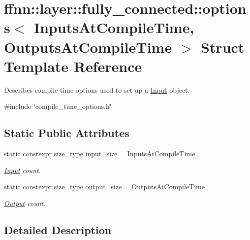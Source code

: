 \hypertarget{structffnn_1_1layer_1_1fully__connected_1_1options}{\section{ffnn\-:\-:layer\-:\-:fully\-\_\-connected\-:\-:options$<$ Inputs\-At\-Compile\-Time, Outputs\-At\-Compile\-Time $>$ Struct Template Reference}
\label{structffnn_1_1layer_1_1fully__connected_1_1options}
}


Describes compile-\/time options used to set up a \hyperlink{classffnn_1_1layer_1_1_input}{Input} object.  




{\ttfamily \#include \char`\"{}compile\-\_\-time\-\_\-options.\-h\char`\"{}}

\subsection*{Static Public Attributes}
\begin{DoxyCompactItemize}
\item 
static constexpr \hyperlink{namespaceffnn_a63b90a2fd70eb76684eac482a51633e5}{size\-\_\-type} \hyperlink{structffnn_1_1layer_1_1fully__connected_1_1options_ae136ed9ebf9016f397acc9f3c10c9a32}{input\-\_\-size} = Inputs\-At\-Compile\-Time
\begin{DoxyCompactList}\small\item\em \hyperlink{classffnn_1_1layer_1_1_input}{Input} count. \end{DoxyCompactList}\item 
static constexpr \hyperlink{namespaceffnn_a63b90a2fd70eb76684eac482a51633e5}{size\-\_\-type} \hyperlink{structffnn_1_1layer_1_1fully__connected_1_1options_a7b40e94c99dc865af66d8f2ee5a8c4cc}{output\-\_\-size} = Outputs\-At\-Compile\-Time
\begin{DoxyCompactList}\small\item\em \hyperlink{classffnn_1_1layer_1_1_output}{Output} count. \end{DoxyCompactList}\end{DoxyCompactItemize}


\subsection{Detailed Description}
